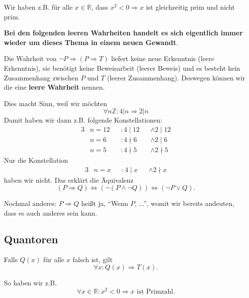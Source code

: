 \documentclass[a4paper]{amsart}
\theoremstyle{definition}
\newcommand{\R}{\ensuremath{\mathbb{ R }}}
\newcommand{\Z}{\ensuremath{\mathbb{ Z }}}
\begin{document}
Wir haben z.B. für alle $x \in \R$, dass $x^2 < 0 \Rightarrow x$ ist gleichzeitig prim und nicht prim.

\textbf{Bei den folgenden leeren Wahrheiten handelt es sich eigentlich immer wieder um dieses Thema in einem neuen Gewandt}.

Die Wahrheit von $\neg P \Rightarrow (P  \Rightarrow T)$ liefert keine neue Erkenntnis (leere Erkenntnis), sie benötigt keine Beweisarbeit (leerer Beweis) und es besteht kein Zusammenhang zwischen $P$ und $T$ (leerer Zusammenhang). Deswegen können wir die eine \textbf{leere Wahrheit} nennen.

Dies macht Sinn, weil wir möchten
\begin{equation}
   \forall n \Z \colon 4 | n \Rightarrow 2 | n
\end{equation}
Damit haben wir dann z.B. folgende Konstellationen:
\begin{alignat}{3}
   &n = 12 &&\colon 4 \mid 12 &&\land 2 \mid 12\\
   &n = 6  &&\colon 4 \nmid 6 &&\land 2 \mid 6\\
   &n = 5  &&\colon 4 \nmid 5 &&\land 2 \nmid 5
\end{alignat}
Nur die Konstellation
\begin{alignat}{3}
   &n = x  &&\colon 4 \mid x &&\land 2 \nmid x
\end{alignat}
haben wir nicht. Das erklärt die Äquivalenz
\begin{equation}
   (P \Rightarrow Q) \Leftrightarrow (\neg (P \land \neg Q)) \Leftrightarrow (\neg P \lor Q).
\end{equation}

Nochmal anderes: $P \Rightarrow Q$ heißt ja, "`Wenn $P$, ..."', womit wir bereits andeuten, dass es auch anderes sein kann.

\subsection{Quantoren}
Falls $Q( x )$ für alle $x$ falsch ist, gilt
\begin{equation}
   \forall x \colon Q(x) \Rightarrow  T(x).
\end{equation} 

So haben wir z.B.
\begin{equation}
   \forall x \in \R \colon x^2 < 0 \Rightarrow  x \text{ ist Primzahl}.
\end{equation} 
\end{document}
